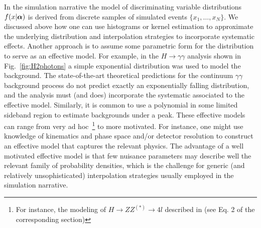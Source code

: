 \documentclass{cernrep}
\def\vec#1{\ifmmode
\mathchoice{\mbox{\boldmath$\displaystyle\bf#1$}}
{\mbox{\boldmath$\textstyle\bf#1$}}
{\mbox{\boldmath$\scriptstyle\bf#1$}}
{\mbox{\boldmath$\scriptscriptstyle\bf#1$}}\else
{\mbox{\boldmath$\bf#1$}}\fi}
\begin{document}
In the simulation narrative the model of discriminating variable distributions $f(x|\vec\alpha)$ is derived from discrete samples of simulated events $\{x_1,\dots,x_N\}$.   We discussed above how one can use histograms or kernel estimation to approximate the underlying distribution and interpolation strategies to incorporate systematic effects.  Another approach is to assume some parametric form for the distribution to serve as an effective model.  For example, in the $H\to\gamma\gamma$ analysis shown in Fig.~\ref{fig:H2photons} a simple exponential distribution was used to model the background.  The state-of-the-art theoretical predictions for the continuum $\gamma\gamma$ background process do not predict exactly an exponentially falling distribution, and the analysis must (and does) incorporate the systematic associated to the effective model.  Similarly, it is common to use a polynomial in some limited sideband region to estimate backgrounds under a peak.  These effective models can range from very ad hoc~\footnote{For instance, the modeling of $H\to ZZ^{(*)}\to 4l$  described in \cite{Aad:2009wy} (see Eq. 2 of the corresponding section)  } to more motivated.  For instance, one might use knowledge of kinematics and phase space and/or detector resolution to construct an effective model that captures the relevant physics.  The advantage of a well motivated effective model is that few nuisance parameters may describe well the relevant family of probability densities, which is the challenge for generic (and relatively unsophisticated) interpolation strategies usually employed in the simulation narrative.

 

\end{document}
